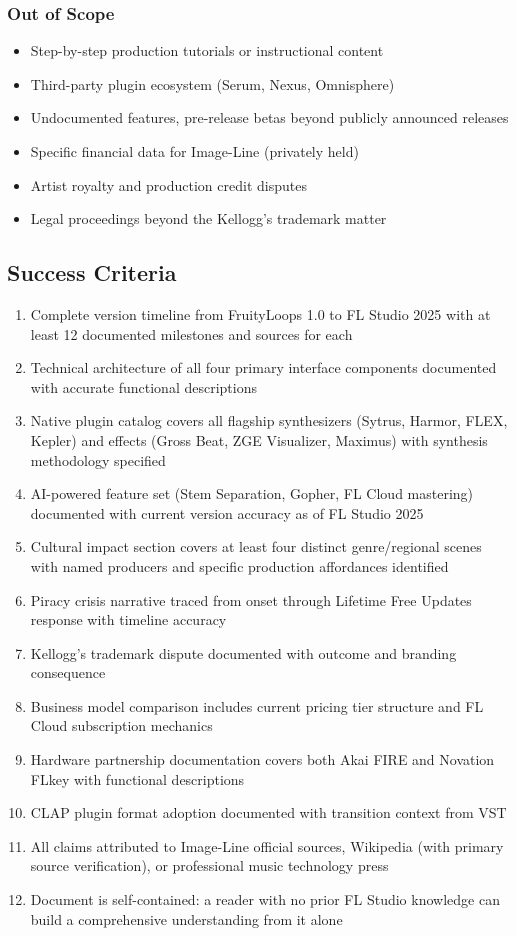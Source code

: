 \documentclass[11pt,letterpaper]{article}
\begin{document}
\subsubsection{Out of Scope}
\begin{itemize}[noitemsep]
  \item Step-by-step production tutorials or instructional content
  \item Third-party plugin ecosystem (Serum, Nexus, Omnisphere)
  \item Undocumented features, pre-release betas beyond publicly announced releases
  \item Specific financial data for Image-Line (privately held)
  \item Artist royalty and production credit disputes
  \item Legal proceedings beyond the Kellogg's trademark matter
\end{itemize}

\subsection{Success Criteria}

\begin{enumerate}
  \item Complete version timeline from FruityLoops 1.0 to FL Studio 2025 with at least 12 documented milestones and sources for each
  \item Technical architecture of all four primary interface components documented with accurate functional descriptions
  \item Native plugin catalog covers all flagship synthesizers (Sytrus, Harmor, FLEX, Kepler) and effects (Gross Beat, ZGE Visualizer, Maximus) with synthesis methodology specified
  \item AI-powered feature set (Stem Separation, Gopher, FL Cloud mastering) documented with current version accuracy as of FL Studio 2025
  \item Cultural impact section covers at least four distinct genre/regional scenes with named producers and specific production affordances identified
  \item Piracy crisis narrative traced from onset through Lifetime Free Updates response with timeline accuracy
  \item Kellogg's trademark dispute documented with outcome and branding consequence
  \item Business model comparison includes current pricing tier structure and FL Cloud subscription mechanics
  \item Hardware partnership documentation covers both Akai FIRE and Novation FLkey with functional descriptions
  \item CLAP plugin format adoption documented with transition context from VST
  \item All claims attributed to Image-Line official sources, Wikipedia (with primary source verification), or professional music technology press
  \item Document is self-contained: a reader with no prior FL Studio knowledge can build a comprehensive understanding from it alone
\end{enumerate}
\end{document}
